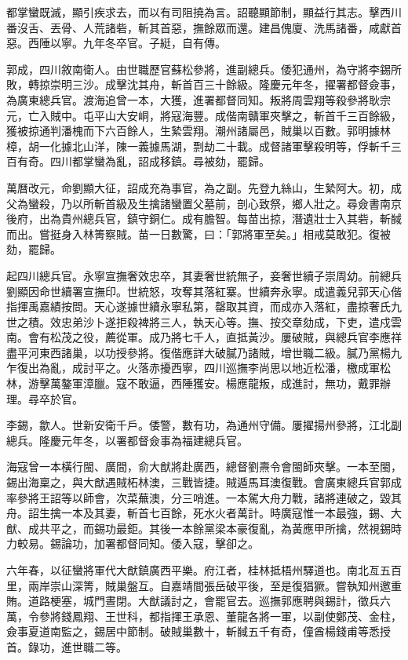 \begin{pinyinscope}
都掌蠻既滅，顯引疾求去，而以有司阻撓為言。詔聽顯節制，顯益行其志。擊西川番沒舌、丟骨、人荒諸砦，斬其首惡，撫餘眾而還。建昌傀廈、洗馬諸番，咸獻首惡。西陲以寧。九年冬卒官。子綎，自有傳。

郭成，四川敘南衛人。由世職歷官蘇松參將，進副總兵。倭犯通州，為守將李錫所敗，轉掠崇明三沙。成擊沈其舟，斬首百三十餘級。隆慶元年冬，擢署都督僉事，為廣東總兵官。渡海追曾一本，大獲，進署都督同知。叛將周雲翔等殺參將耿宗元，亡入賊中。屯平山大安峒，將寇海豐。成偕南贛軍夾擊之，斬首千三百餘級，獲被掠通判潘槐而下六百餘人，生縶雲翔。潮州諸屬邑，賊巢以百數。郭明據林樟，胡一化據北山洋，陳一義據馬湖，剽劫二十載。成督諸軍擊殺明等，俘斬千三百有奇。四川都掌蠻為亂，詔成移鎮。尋被劾，罷歸。

萬曆改元，命劉顯大征，詔成充為事官，為之副。先登九絲山，生縶阿大。初，成父為蠻殺，乃以所斬首級及生擒諸蠻置父墓前，剖心致祭，鄉人壯之。尋僉書南京後府，出為貴州總兵官，鎮守銅仁。成有膽智。每苗出掠，潛遺壯士入其砦，斬馘而出。嘗挺身入林箐察賊。苗一日數驚，曰：「郭將軍至矣。」相戒莫敢犯。復被劾，罷歸。

起四川總兵官。永寧宣撫奢效忠卒，其妻奢世統無子，妾奢世續子崇周幼。前總兵劉顯因命世續署宣撫印。世統怒，攻奪其落紅寨。世續奔永寧。成遣義兒郭天心偕指揮禹嘉績按問。天心遂據世續永寧私第，罄取其資，而成亦入落紅，盡掠奢氏九世之積。效忠弟沙卜遂拒殺裨將三人，執天心等。撫、按交章劾成，下吏，遣戍雲南。會有松茂之役，薦從軍。成乃將七千人，直抵黃沙。屢破賊，與總兵官李應祥盡平河東西諸巢，以功授參將。復偕應詳大破膩乃諸賊，增世職二級。膩乃黨楊九乍復出為亂，成討平之。火落赤擾西寧，四川巡撫李尚思以地近松潘，檄成軍松林，游擊萬鏊軍漳臘。寇不敢逼，西陲獲安。楊應龍叛，成進討，無功，戴罪辦理。尋卒於官。

李錫，歙人。世新安衛千戶。倭警，數有功，為通州守備。屢擢揚州參將，江北副總兵。隆慶元年冬，以署都督僉事為福建總兵官。

海寇曾一本橫行閩、廣間，俞大猷將赴廣西，總督劉燾令會閩師夾擊。一本至閩，錫出海稟之，與大猷遇賊柘林澳，三戰皆捷。賊遁馬耳澳復戰。會廣東總兵官郭成率參將王詔等以師會，次菜蕪澳，分三哨進。一本駕大舟力戰，諸將連破之，毀其舟。詔生擒一本及其妻，斬首七百餘，死水火者萬計。時廣寇惟一本最強，錫、大猷、成共平之，而錫功最鉅。其後一本餘黨梁本豪復亂，為黃應甲所擒，然視錫時力較易。錫論功，加署都督同知。倭入寇，擊卻之。

六年春，以征蠻將軍代大猷鎮廣西平樂。府江者，桂林抵梧州驛道也。南北亙五百里，兩岸崇山深箐，賊巢盤互。自嘉靖間張岳破平後，至是復猖獗。嘗執知州邀重賄。道路梗塞，城門晝閉。大猷議討之，會罷官去。巡撫郭應聘與錫計，徵兵六萬，令參將錢鳳翔、王世科，都指揮王承恩、董龍各將一軍，以副使鄭茂、金柱，僉事夏道南監之，錫居中節制。破賊巢數十，斬馘五千有奇，僮酋楊錢甫等悉授首。錄功，進世職二等。


\end{pinyinscope}
